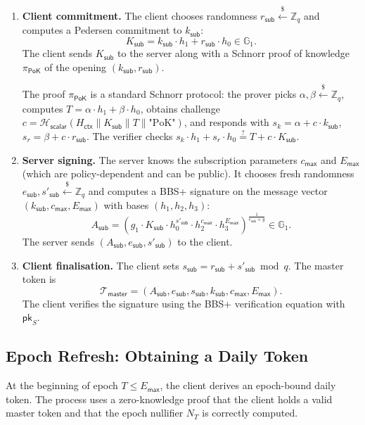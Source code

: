 \documentclass[11pt]{article}
\theoremstyle{definitionstyle}
\theoremstyle{plain}
\begin{document}
\begin{enumerate}[leftmargin=*]
\item \textbf{Client commitment.}
  The client chooses randomness $r_{\mathsf{sub}} \xleftarrow{\$} \mathbb{Z}_q$ and computes a Pedersen commitment to $k_{\mathsf{sub}}$:
  \[
  K_{\mathsf{sub}} = k_{\mathsf{sub}} \cdot h_1 + r_{\mathsf{sub}} \cdot h_0 \in \mathbb{G}_1.
  \]
  The client sends $K_{\mathsf{sub}}$ to the server along with a Schnorr proof of knowledge $\pi_{\mathsf{PoK}}$ of the opening $(k_{\mathsf{sub}}, r_{\mathsf{sub}})$.

  The proof $\pi_{\mathsf{PoK}}$ is a standard Schnorr protocol: the prover picks $\alpha, \beta \xleftarrow{\$} \mathbb{Z}_q$, computes $T = \alpha \cdot h_1 + \beta \cdot h_0$, obtains challenge $c = \mathcal{H}_{\mathsf{scalar}}(H_{\mathsf{ctx}} \parallel K_{\mathsf{sub}} \parallel T \parallel \text{"PoK"})$, and responds with $s_k = \alpha + c \cdot k_{\mathsf{sub}}$, $s_r = \beta + c \cdot r_{\mathsf{sub}}$. The verifier checks $s_k \cdot h_1 + s_r \cdot h_0 \stackrel{?}{=} T + c \cdot K_{\mathsf{sub}}$.

\item \textbf{Server signing.}
  The server knows the subscription parameters $c_{\mathsf{max}}$ and $E_{\mathsf{max}}$ (which are policy-dependent and can be public). It chooses fresh randomness $e_{\mathsf{sub}}, s'_{\mathsf{sub}} \xleftarrow{\$} \mathbb{Z}_q$ and computes a BBS+ signature on the message vector $(k_{\mathsf{sub}}, c_{\mathsf{max}}, E_{\mathsf{max}})$ with bases $(h_1, h_2, h_3)$:
  \[
  A_{\mathsf{sub}} = \left( g_1 \cdot K_{\mathsf{sub}} \cdot h_0^{s'_{\mathsf{sub}}} \cdot h_2^{c_{\mathsf{max}}} \cdot h_3^{E_{\mathsf{max}}} \right)^{\frac{1}{e_{\mathsf{sub}} + y}} \in \mathbb{G}_1.
  \]
  The server sends $(A_{\mathsf{sub}}, e_{\mathsf{sub}}, s'_{\mathsf{sub}})$ to the client.

\item \textbf{Client finalisation.}
  The client sets $s_{\mathsf{sub}} = r_{\mathsf{sub}} + s'_{\mathsf{sub}} \bmod q$. The master token is
  \[
  \mathcal{T}_{\mathsf{master}} = (A_{\mathsf{sub}}, e_{\mathsf{sub}}, s_{\mathsf{sub}}, k_{\mathsf{sub}}, c_{\mathsf{max}}, E_{\mathsf{max}}).
  \]
  The client verifies the signature using the BBS+ verification equation with $\mathsf{pk}_S$.
\end{enumerate}

\subsection{Epoch Refresh: Obtaining a Daily Token}
At the beginning of epoch $T \le E_{\mathsf{max}}$, the client derives an epoch-bound daily token. The process uses a zero-knowledge proof that the client holds a valid master token and that the epoch nullifier $N_T$ is correctly computed.
\end{document}
